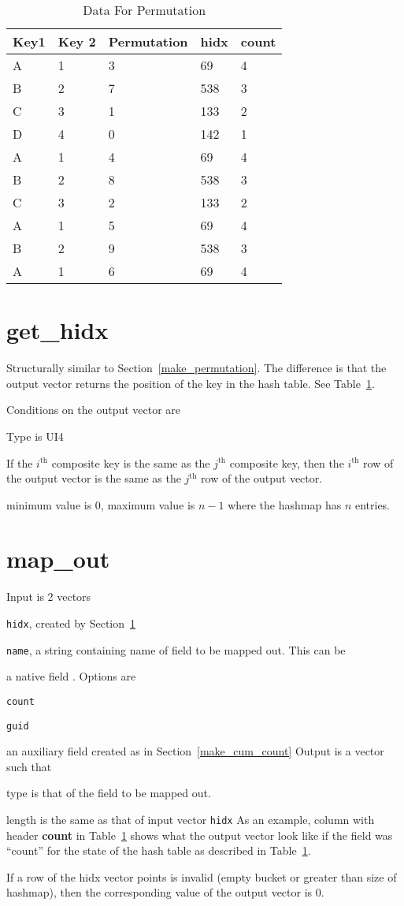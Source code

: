 \begin{table}
\centering
\begin{tabular}{|l|l||l|l|l|} \hline \hline 
{\bf Key1 } & {\bf Key 2} & {\bf Permutation} & {\bf hidx} 
& {\bf count} \\ \hline \hline
A & 1 & 3 & 69  & 4 \\ \hline
B & 2 & 7 & 538 & 3 \\ \hline
C & 3 & 1 & 133 & 2 \\ \hline
D & 4 & 0 & 142 & 1 \\ \hline
A & 1 & 4 & 69  & 4 \\ \hline
B & 2 & 8 & 538  & 3 \\ \hline
C & 3 & 2 & 133 & 2 \\ \hline
A & 1 & 5 & 69 & 4 \\ \hline
B & 2 & 9 & 538 & 3 \\ \hline
A & 1 & 6 & 69  & 4 \\ \hline
\hline
\end{tabular}
\caption{Data For Permutation}
\label{data_1}
\end{table}

\section{get\_hidx}
\label{get_hidx}

Structurally similar to Section~\ref{make_permutation}. The difference is that
the output vector returns the position of the key in the hash table. See
Table~\ref{data_1}.

Conditions on the output vector are 
\be
\item Type is UI4
\item If the \(i^{\mathrm{th}}\) composite key is the same as the 
\(j^{\mathrm{th}}\) composite key, then the 
\(i^{\mathrm{th}}\) row of the output vector is the same as the 
\(j^{\mathrm{th}}\)  row of the output vector.
\item minimum value is 0, maximum value is \(n-1\) where the hashmap has \(n\)
entries.
\ee

\section{map\_out}
\label{map_out}
Input is 2 vectors
\be
\item {\tt hidx}, created by Section~\ref{get_hidx}
\item {\tt name}, a string containing name of field to be mapped out. 
This can be 
\be
\item a native field . Options are 
\be
\item {\tt count}
\item {\tt guid}
\ee
\item an auxiliary field created as in Section~\ref{make_cum_count}
\ee
\ee
Output is a vector such that 
\be
\item type is that of the field to be mapped out.
\item length is the same as that of input vector {\tt hidx} 
\ee
As an example, column with header {\bf count} in Table~\ref{data_1} 
shows what the output vector look like if the field was ``count'' for the state
of the hash table as described in Table~\ref{data_1}.

If a row of the hidx vector points is invalid (empty bucket or greater than size
of hashmap), then the corresponding value of the output vector is 0.

